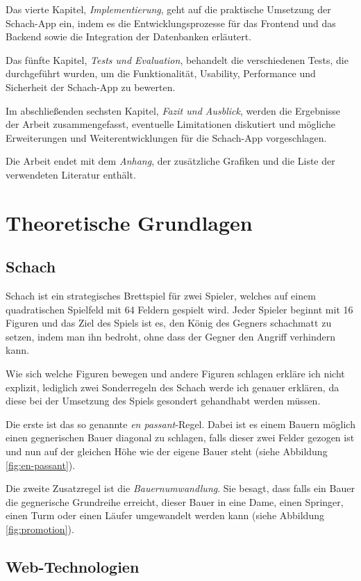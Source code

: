 \documentclass[a4paper,12pt]{report}
\begin{document}
Das vierte Kapitel, \textit{Implementierung}, geht auf die praktische Umsetzung der Schach-App ein, indem es die Entwicklungsprozesse für das Frontend und das Backend sowie die Integration der Datenbanken erläutert.

Das fünfte Kapitel, \textit{Tests und Evaluation}, behandelt die verschiedenen Tests, die durchgeführt wurden, um die Funktionalität, Usability, Performance und Sicherheit der Schach-App zu bewerten.

Im abschließenden sechsten Kapitel, \textit{Fazit und Ausblick}, werden die Ergebnisse der Arbeit zusammengefasst, eventuelle Limitationen diskutiert und mögliche Erweiterungen und Weiterentwicklungen für die Schach-App vorgeschlagen.

Die Arbeit endet mit dem \textit{Anhang}, der zusätzliche Grafiken und die Liste der verwendeten Literatur enthält.
\chapter{Theoretische Grundlagen}
    \section{Schach}
   Schach ist ein strategisches Brettspiel für zwei Spieler, welches auf einem quadratischen Spielfeld mit 64 Feldern gespielt wird. Jeder Spieler beginnt mit 16 Figuren und das Ziel des Spiels ist es, den König des Gegners schachmatt zu setzen, indem man ihn bedroht, ohne dass der Gegner den Angriff verhindern kann. 
   
   Wie sich welche Figuren bewegen und andere Figuren schlagen erkläre ich nicht explizit, lediglich zwei Sonderregeln des Schach werde ich genauer erklären, da diese bei der Umsetzung des Spiels gesondert gehandhabt werden müssen.
   
   Die erste ist das so genannte \textit{en passant}-Regel. Dabei ist es einem Bauern möglich einen gegnerischen Bauer diagonal zu schlagen, falls dieser zwei Felder gezogen ist und nun auf der gleichen Höhe wie der eigene Bauer steht (siehe Abbildung \ref{fig:en-passant}).
   
   Die zweite Zusatzregel ist die \textit{Bauernumwandlung}. Sie besagt, dass falls ein Bauer die gegnerische Grundreihe erreicht, dieser Bauer in eine Dame, einen Springer, einen Turm oder einen Läufer umgewandelt werden kann (siehe Abbildung \ref{fig:promotion}).
    \section{Web-Technologien}
\end{document}

